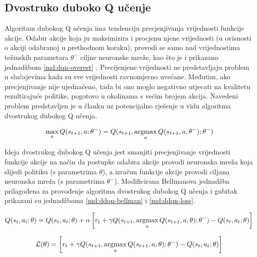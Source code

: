 
\subsection{Dvostruko duboko Q učenje}

Algoritam dubokog Q učenja ima tendenciju precjenjivanja vrijednosti funkcije akcije. Odabir akcije koja ju maksimizira i procjenu njene vrijednosti (u ovisnosti o akciji odabranoj u prethodnom koraku), provodi se samo nad vrijednostima težinskih parametara $\theta^-$ ciljne neuronske mreže, kao što je i prikazano jednadžbom \ref{md:dqn-overest} \cite{DQN-impl}. Precijenjene vrijednosti ne predstavljaju problem u slučajevima kada su sve vrijednosti ravnomjerno uvećane. Međutim, ako precjenjivanje nije ujednačeno, tada bi ono moglo negativno utjecati na kvalitetu rezultirajuće politike, pogotovo u okolinama s većim brojem akcija. Navedeni problem predstavljen je u članku \cite{DDQL} uz potencijalno rješenje u vidu algoritma dvostrukog dubokog Q učenja.

\begin{equation}
    \label{md:dqn-overest}
    \max_a Q(s_{t+1}, a; \theta^-) =  Q(s_{t+1}, \operatorname*{argmax}_a Q(s_{t+1}, a, \theta^-); \theta^-)
\end{equation}

\bigskip

Ideja dvostrukog dubokog Q učenja jest smanjiti precjenjivanje vrijednosti funkcije akcije na način da postupke odabira akcije provodi neuronska mreža koja slijedi politiku (s parametrima $\theta$), a izračun funkcije akcije provodi ciljana neuronska mreža (s parametrima $\theta^-$). Modificirana Bellmanova jednadžba prilagođena za provođenje algoritma dvostrukog dubokog Q učenja i gubitak prikazani su jednadžbama \ref{md:ddqn-bellman} i \ref{md:ddqn-loss}.  

\begin{equation}
    \label{md:ddqn-bellman}
    Q(s_t, a_t; \theta) = Q(s_t, a_t; \theta) + \alpha \left[ r_t + \gamma Q(s_{t+1}, \operatorname*{argmax}_a Q(s_{t+1}, a, \theta); \theta^-) - Q(s_t, a_t; \theta) \right]
\end{equation}

\begin{equation}
    \label{md:ddqn-loss}
    \mathcal{L}(\theta) = \left[  r_t + \gamma Q(s_{t+1}, \operatorname*{argmax}_a Q(s_{t+1}, a, \theta); \theta^-) - Q(s_t, a_t; \theta) \right]
\end{equation}

\bigskip

